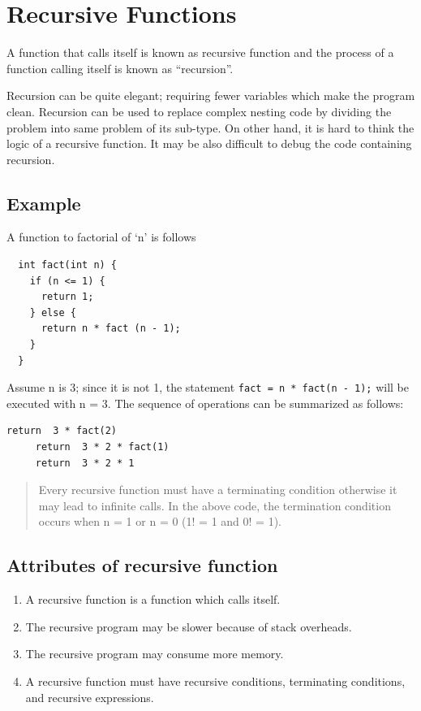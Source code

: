 \documentclass[11pt,a4paper]{article}
\author{TalentSprint}
\date{}
\begin{document}

\section*{Recursive Functions}
A function that calls itself is known as recursive function and the process of a function calling itself is known as ``recursion''.

Recursion can be quite elegant;  requiring fewer variables which make the program clean. Recursion can be used to replace complex nesting code by dividing the problem into same problem of its sub-type. On other hand, it is hard to think the logic of a recursive function. It may be also difficult to debug the code containing recursion.

\subsection*{Example}
A function to factorial of `n' is follows
\begin{lstlisting}
  int fact(int n) {
    if (n <= 1) {
      return 1;
    } else {
      return n * fact (n - 1);
    }
  }
\end{lstlisting}

Assume n is 3; since it is not 1, the statement \texttt{fact = n * fact(n - 1);}  will  be executed with n = 3. The sequence of operations can be summarized as follows:
\begin{lstlisting}[numbers=none]
     return  3 * fact(2)
     return  3 * 2 * fact(1)
     return  3 * 2 * 1
\end{lstlisting}

\begin{quote}
  Every recursive function must have a terminating condition otherwise it may lead to infinite calls. In the above code, the termination condition occurs when n = 1 or n = 0 (1! = 1 and 0! = 1).
  \end{quote}

\subsection*{Attributes of recursive function}
\begin{enumerate}
\item A recursive function is a function which calls itself.
\item The recursive program may be slower because of stack overheads. 
\item The recursive program may consume more memory.
\item A recursive function must have recursive conditions, terminating conditions, and recursive expressions.
\end{enumerate}
\end{document}

